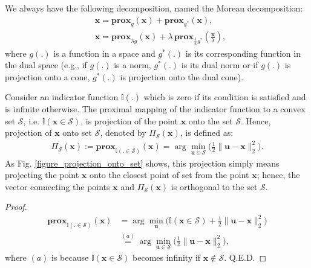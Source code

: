 \documentclass[lang=cn,10pt]{gorgeousnbook}
\numberwithin{equation}{section}%
\numberwithin{figure}{section}%
\begin{document}
\begin{lemma}
We always have the following decomposition, named the Moreau decomposition:
\begin{align}
& \boldsymbol{x} = \textbf{prox}_{g}(\boldsymbol{x}) + \textbf{prox}_{g^*}(\boldsymbol{x}), \label{equation_Moreau_decomposition} \\
& \boldsymbol{x} = \textbf{prox}_{\lambda g}(\boldsymbol{x}) + \lambda\, \textbf{prox}_{\frac{1}{\lambda} g^*}(\frac{\boldsymbol{x}}{\lambda}), \label{equation_Moreau_decomposition_with_lambda}
\end{align}
where $g(.)$ is a function in a space and $g^*(.)$ is its corresponding function in the dual space (e.g., if $g(.)$ is a norm, $g^*(.)$ is its dual norm or if $g(.)$ is projection onto a cone, $g^*(.)$ is projection onto the dual cone). 
\end{lemma}

\begin{lemma}\label{lemma_projection_onto_set}
Consider an indicator function $\mathbb{I}(.)$ which is zero if its condition is satisfied and is infinite otherwise. 
The proximal mapping of the indicator function to a convex set $\mathcal{S}$, i.e. $\mathbb{I}(\boldsymbol{x} \in \mathcal{S})$, is projection of the point $\boldsymbol{x}$ onto the set $\mathcal{S}$. Hence, projection of $\boldsymbol{x}$ onto set $\mathcal{S}$, denoted by $\Pi_{\mathcal{S}}(\boldsymbol{x})$, is defined as:
\begin{align}\label{equation_projection_onto_set}
\Pi_{\mathcal{S}}(\boldsymbol{x}) := \textbf{prox}_{\mathbb{I}(. \in \mathcal{S})}(\boldsymbol{x}) = \arg\min_{\boldsymbol{u} \in \mathcal{S}} \Big( \frac{1}{2} \|\boldsymbol{u} - \boldsymbol{x}\|_2^2 \Big).
\end{align}
As Fig. \ref{figure_projection_onto_set} shows, this projection simply means projecting the point $\boldsymbol{x}$ onto the closest point of set from the point $\boldsymbol{x}$; hence, the vector connecting the points $\boldsymbol{x}$ and $\Pi_{\mathcal{S}}(\boldsymbol{x})$ is orthogonal to the set $\mathcal{S}$.
\end{lemma}
\begin{proof}
\begin{align*}
\textbf{prox}_{\mathbb{I}(. \in \mathcal{S})}(\boldsymbol{x}) &= \arg\min_{\boldsymbol{u}} \Big( \mathbb{I}(\boldsymbol{x} \in \mathcal{S}) + \frac{1}{2} \|\boldsymbol{u} - \boldsymbol{x}\|_2^2 \Big) \\
&\overset{(a)}{=} \arg\min_{\boldsymbol{u} \in \mathcal{S}} \Big( \frac{1}{2} \|\boldsymbol{u} - \boldsymbol{x}\|_2^2 \Big),
\end{align*}
where $(a)$ is because $\mathbb{I}(\boldsymbol{x} \in \mathcal{S})$ becomes infinity if $\boldsymbol{x} \not\in \mathcal{S}$. Q.E.D.
\end{proof}
\end{document}
